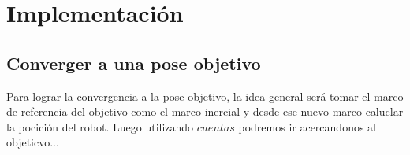 \section{Implementación}

\subsection{Converger a una pose objetivo}

Para lograr la convergencia a la pose objetivo, la idea general será tomar el marco de referencia del objetivo como el marco inercial y desde ese nuevo marco caluclar la pocición del robot. Luego utilizando $cuentas$ podremos ir acercandonos al objeticvo...
